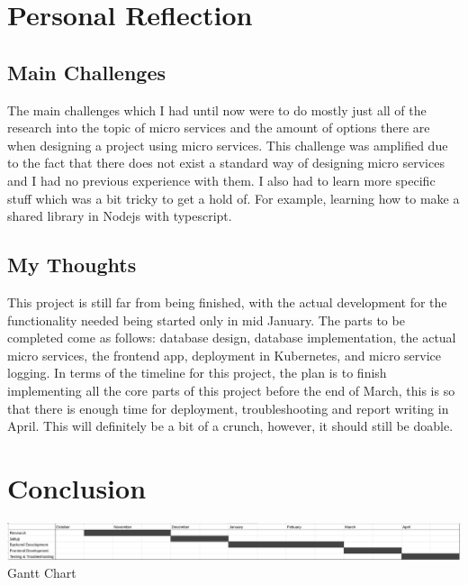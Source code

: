 \documentclass[11pt]{article}
\begin{document}
\section{Personal Reflection}

\subsection{Main Challenges}
The main challenges which I had until now were to do mostly just all of the research into the topic of micro services and the amount of options there are when designing a project using micro services. This challenge was amplified due to the fact that there does not exist a standard way of designing micro services and I had no previous experience with them. I also had to learn more specific stuff which was a bit tricky to get a hold of. For example, learning how to make a shared library in Nodejs with typescript.\par

\subsection{My Thoughts}
This project is still far from being finished, with the actual development for the functionality needed being started only in mid January. The parts to be completed come as follows: database design, database implementation, the actual micro services, the frontend app, deployment in Kubernetes, and micro service logging. In terms of the timeline for this project, the plan is to finish implementing all the core parts of this project before the end of March, this is so that there is enough time for deployment, troubleshooting and report writing in April. This will definitely be a bit of a crunch, however, it should still be doable.\par

\newpage
\section{Conclusion}

\begin{center}
    \includegraphics[scale=0.4]{GanttChart}
    Gantt Chart\par
\end{center}
\end{document}

